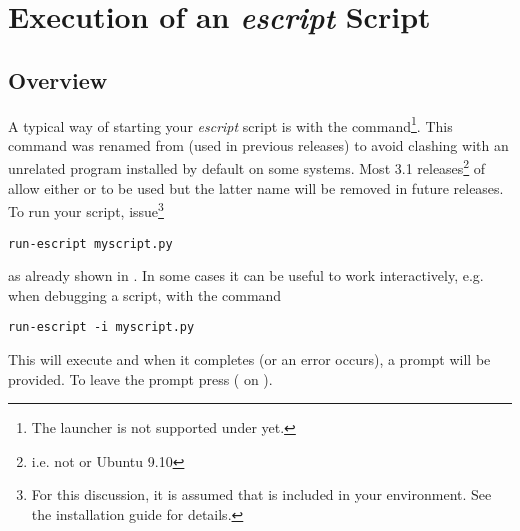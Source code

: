 
%
%
%

\chapter{Execution of an {\it escript} Script}
\label{EXECUTION}

\section{Overview}
A typical way of starting your {\it escript} script  is with the  command\footnote{The  launcher is not supported under \WINDOWS yet.}.
This command was renamed from  (used in previous releases) to
avoid clashing with an unrelated program installed by default on some systems.
Most 3.1 releases\footnote{i.e. not \WINDOWS or Ubuntu 9.10} of \escript allow
either  or  to be used but the latter
name will be removed in future releases. To run your script, issue\footnote{For
this discussion, it is assumed that  is included in
your  environment. See the installation guide for details.}
\begin{verbatim}
run-escript myscript.py
\end{verbatim}
as already shown in .
In some cases it can be useful to work interactively, e.g. when debugging a
script, with the command 
\begin{verbatim}
run-escript -i myscript.py
\end{verbatim}
This will execute  and when it completes (or an error occurs),
a \PYTHON prompt will be provided.
To leave the prompt press  ( on \WINDOWS).

